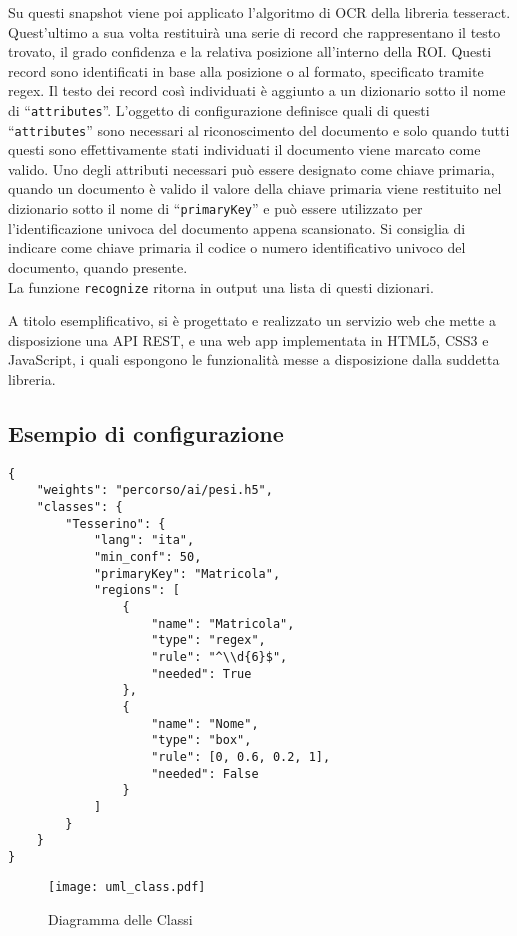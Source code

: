 \documentclass[12pt,a4paper]{article}
\begin{document}
Su questi snapshot viene poi applicato l'algoritmo di OCR della libreria
tesseract. Quest'ultimo a sua volta restituirà una serie di record che
rappresentano il testo trovato, il grado confidenza e la relativa
posizione all'interno della ROI. Questi record sono identificati in base
alla posizione o al formato, specificato tramite regex. Il testo dei
record così individuati è aggiunto a un dizionario sotto il nome di
``\texttt{attributes}''. L'oggetto di configurazione definisce quali di
questi ``\texttt{attributes}'' sono necessari al riconoscimento del
documento e solo quando tutti questi sono effettivamente stati
individuati il documento viene marcato come valido. Uno degli attributi
necessari può essere designato come chiave primaria, quando un documento
è valido il valore della chiave primaria viene restituito nel dizionario
sotto il nome di ``\texttt{primaryKey}'' e può essere utilizzato per
l'identificazione univoca del documento appena scansionato. Si consiglia
di indicare come chiave primaria il codice o numero identificativo
univoco del documento, quando presente.\\
La funzione \texttt{recognize} ritorna in output una lista di questi
dizionari.

A titolo esemplificativo, si è progettato e realizzato un servizio web
che mette a disposizione una API REST, e una web app implementata in
HTML5, CSS3 e JavaScript, i quali espongono le funzionalità messe a
disposizione dalla suddetta libreria.

\pagebreak

\subsection{Esempio di configurazione}
\begin{verbatim}
{
    "weights": "percorso/ai/pesi.h5",
    "classes": {
        "Tesserino": {
            "lang": "ita",
            "min_conf": 50,
            "primaryKey": "Matricola",
            "regions": [
                {
                    "name": "Matricola",
                    "type": "regex",
                    "rule": "^\\d{6}$",
                    "needed": True
                },
                {
                    "name": "Nome",
                    "type": "box",
                    "rule": [0, 0.6, 0.2, 1],
                    "needed": False
                }
            ]
        }
    }
}
\end{verbatim}

\begin{figure}[p]
  \caption{Diagramma delle Classi}
  \centering
  \texttt{[image: uml\_class.pdf]}
\end{figure}
\end{document}
